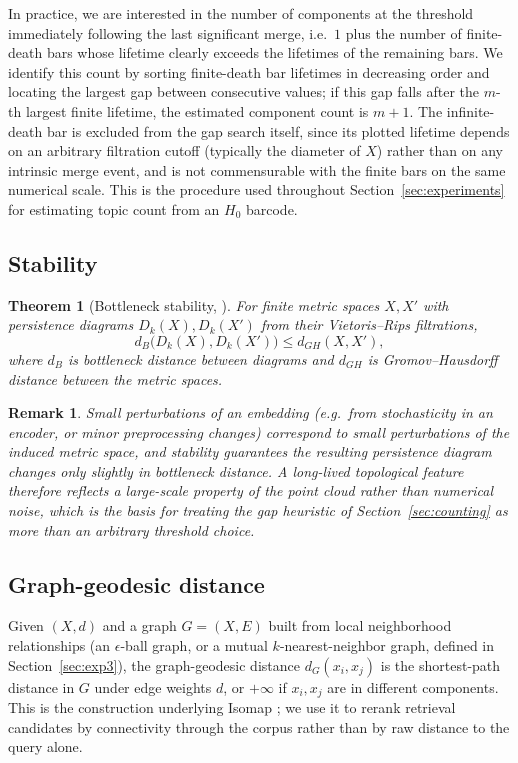 \documentclass[11pt]{article}
\newtheorem{theorem}{Theorem}
\newtheorem{remark}{Remark}
\begin{document}
In practice, we are interested in the number of components at the threshold immediately following the last significant merge, i.e.\ $1$ plus the number of finite-death bars whose lifetime clearly exceeds the lifetimes of the remaining bars. We identify this count by sorting finite-death bar lifetimes in decreasing order and locating the largest gap between consecutive values; if this gap falls after the $m$-th largest finite lifetime, the estimated component count is $m+1$. The infinite-death bar is excluded from the gap search itself, since its plotted lifetime depends on an arbitrary filtration cutoff (typically the diameter of $X$) rather than on any intrinsic merge event, and is not commensurable with the finite bars on the same numerical scale. This is the procedure used throughout Section~\ref{sec:experiments} for estimating topic count from an $H_0$ barcode.

\subsection{Stability}

\begin{theorem}[Bottleneck stability, \citealp{cohen2007stability}]
For finite metric spaces $X, X'$ with persistence diagrams $D_k(X), D_k(X')$ from their Vietoris--Rips filtrations,
\[
d_B\big(D_k(X), D_k(X')\big) \leq d_{GH}(X, X'),
\]
where $d_B$ is bottleneck distance between diagrams and $d_{GH}$ is Gromov--Hausdorff distance between the metric spaces.
\end{theorem}

\begin{remark}
Small perturbations of an embedding (e.g.\ from stochasticity in an encoder, or minor preprocessing changes) correspond to small perturbations of the induced metric space, and stability guarantees the resulting persistence diagram changes only slightly in bottleneck distance. A long-lived topological feature therefore reflects a large-scale property of the point cloud rather than numerical noise, which is the basis for treating the gap heuristic of Section~\ref{sec:counting} as more than an arbitrary threshold choice.
\end{remark}

\subsection{Graph-geodesic distance}

Given $(X,d)$ and a graph $G=(X,E)$ built from local neighborhood relationships (an $\epsilon$-ball graph, or a mutual $k$-nearest-neighbor graph, defined in Section~\ref{sec:exp3}), the graph-geodesic distance $d_G(x_i,x_j)$ is the shortest-path distance in $G$ under edge weights $d$, or $+\infty$ if $x_i,x_j$ are in different components. This is the construction underlying Isomap \citep{tenenbaum2000global}; we use it to rerank retrieval candidates by connectivity through the corpus rather than by raw distance to the query alone.
\end{document}

